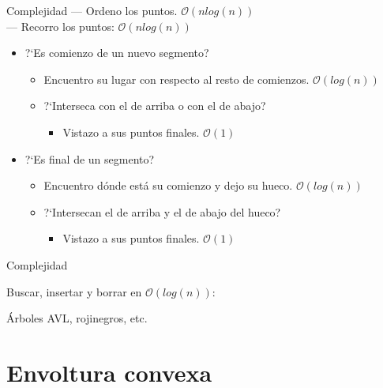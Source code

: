     \begin{frame}{Complejidad}{}
    {\color{orange}---} Ordeno los puntos. {\color{orange}$\mathcal{O}(nlog(n))$}\\
    {\color{orange}---} Recorro los puntos: {\color{orange}$\mathcal{O}(nlog(n))$ }
    \begin{itemize}
        \item ?`Es comienzo de un nuevo segmento?
        \begin{itemize}
        \item Encuentro su lugar con respecto al resto de comienzos. {\color{orange}$\mathcal{O}(log(n))$}
        \item ?`Interseca con el de arriba o con el de abajo?
            \begin{itemize}
            \item Vistazo a sus puntos finales. {\color{orange}$\mathcal{O}(1)$}
            \end{itemize}
        \end{itemize}
        \item ?`Es final de un segmento?
        \begin{itemize}
        \item Encuentro dónde está su comienzo y dejo su hueco. {\color{orange}$\mathcal{O}(log(n))$}
        \item ?`Intersecan el de arriba y el de abajo del hueco?
            \begin{itemize}
            \item Vistazo a sus puntos finales. {\color{orange}$\mathcal{O}(1)$}
            \end{itemize}
        \end{itemize}
    \end{itemize}
    \end{frame}
    
    \begin{frame}{Complejidad}{}
        \begin{center}
            Buscar, insertar y borrar en $\mathcal{O}(log(n))$:
            
            \bigskip
            
            {\huge\color{orange}Árboles AVL, rojinegros, etc.}
        \end{center}
    \end{frame}
    
\section{Envoltura convexa}
    
